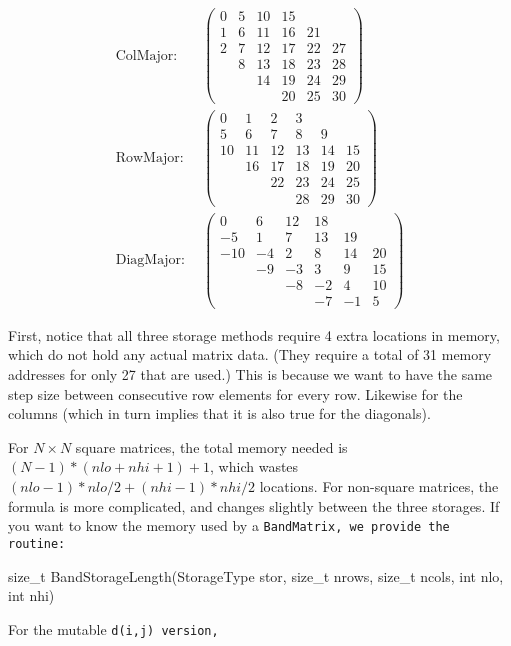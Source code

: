 \begin{align*}
\textrm{ColMajor:} ~ ~ & \left(\begin{array}{cccccc}0 & 5 & 10 & 15 &  &  \\1 & 6 & 11 & 16 & 21 &  \\2 & 7 & 12 & 17 & 22 & 27 \\ & 8 & 13 & 18 & 23 & 28 \\ &  & 14 & 19 & 24 & 29 \\ &  &  & 20 & 25 & 30\end{array}\right) \\
\textrm{RowMajor:} ~  ~ & \left(\begin{array}{cccccc}0 & 1 & 2 & 3 &  &  \\ 5 & 6 & 7 & 8 & 9 &  \\ 10 & 11 & 12 & 13 & 14 & 15 \\ & 16 & 17 & 18 & 19 & 20 \\ &  & 22 & 23 & 24 & 25 \\ &  &  & 28 & 29 & 30\end{array}\right) \\
\textrm{DiagMajor:} ~  ~ & \left(\begin{array}{cccccc}0 & 6 & 12 & 18 &  &  \\-5 & 1 & 7 & 13 & 19 &  \\ -10 & -4 & 2 & 8 & 14 & 20 \\ & -9 & -3 & 3 & 9 & 15 \\ &  & -8 & -2 & 4 & 10 \\ &  &  & -7 & -1 & 5\end{array}\right)
\end{align*}

First, notice that all three storage methods require 4 extra locations in memory, 
which do not hold
any actual matrix data.  
(They require a total of 31 memory addresses for only 27 that are used.)
This is because we want to have the same step size between consecutive row elements
for every row.  Likewise for the columns (which in turn implies that it is also 
true for the diagonals).

For $N\times N$ square matrices, the total memory needed is $(N-1)*(nlo+nhi+1)+1$, 
which wastes $(nlo-1)*nlo/2 + (nhi-1)*nhi/2$ locations.  For non-square
matrices, the formula is more complicated, and changes slightly between the 
three storages.
If you want to know the memory used by a \tt{BandMatrix}, we provide the routine:
\begin{tmvcode}
size_t BandStorageLength(StorageType stor, size_t nrows, size_t ncols, 
        int nlo, int nhi)
\end{tmvcode}
For the mutable \tt{d(i,j)} version, 
  
